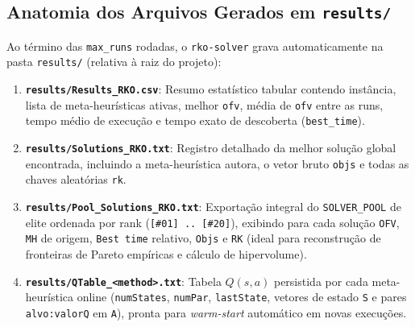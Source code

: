 \documentclass[11pt,a4paper]{article}
\begin{document}
\subsection{Anatomia dos Arquivos Gerados em \texttt{results/}}

Ao término das \texttt{max\_runs} rodadas, o \texttt{rko-solver} grava automaticamente na pasta \texttt{results/} (relativa à raiz do projeto):
\begin{enumerate}[leftmargin=*]
  \item \textbf{\texttt{results/Results\_RKO.csv}}: Resumo estatístico tabular contendo instância, lista de meta-heurísticas ativas, melhor \texttt{ofv}, média de \texttt{ofv} entre as runs, tempo médio de execução e tempo exato de descoberta (\texttt{best\_time}).
  \item \textbf{\texttt{results/Solutions\_RKO.txt}}: Registro detalhado da melhor solução global encontrada, incluindo a meta-heurística autora, o vetor bruto \texttt{objs} e todas as chaves aleatórias \texttt{rk}.
  \item \textbf{\texttt{results/Pool\_Solutions\_RKO.txt}}: Exportação integral do \texttt{SOLVER\_POOL} de elite ordenada por rank (\texttt{[\#01] .. [\#20]}), exibindo para cada solução \texttt{OFV}, \texttt{MH} de origem, \texttt{Best time} relativo, \texttt{Objs} e \texttt{RK} (ideal para reconstrução de fronteiras de Pareto empíricas e cálculo de hipervolume).
  \item \textbf{\texttt{results/QTable\_<method>.txt}}: Tabela $Q(s,a)$ persistida por cada meta-heurística online (\texttt{numStates}, \texttt{numPar}, \texttt{lastState}, vetores de estado \texttt{S} e pares \texttt{alvo:valorQ} em \texttt{A}), pronta para \emph{warm-start} automático em novas execuções.
\end{enumerate}
\end{document}
